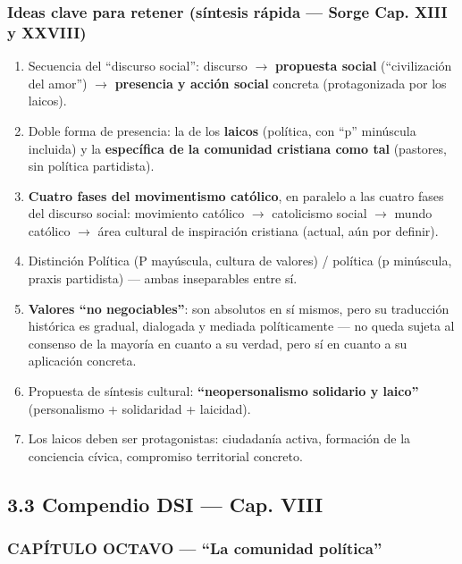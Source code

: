 \documentclass[10pt,a4paper]{article}
\begin{document}
\subsubsection{Ideas clave para retener (síntesis rápida --- Sorge Cap. XIII y XXVIII)}
\begin{enumerate}
\item Secuencia del ``discurso social'': discurso $\rightarrow$ \textbf{propuesta social} (``civilización del amor'') $\rightarrow$ \textbf{presencia y acción social} concreta (protagonizada por los laicos).
\item Doble forma de presencia: la de los \textbf{laicos} (política, con ``p'' minúscula incluida) y la \textbf{específica de la comunidad cristiana como tal} (pastores, sin política partidista).
\item \textbf{Cuatro fases del movimentismo católico}, en paralelo a las cuatro fases del discurso social: movimiento católico $\rightarrow$ catolicismo social $\rightarrow$ mundo católico $\rightarrow$ área cultural de inspiración cristiana (actual, aún por definir).
\item Distinción Política (P mayúscula, cultura de valores) / política (p minúscula, praxis partidista) --- ambas inseparables entre sí.
\item \textbf{Valores ``no negociables''}: son absolutos en sí mismos, pero su traducción histórica es gradual, dialogada y mediada políticamente --- no queda sujeta al consenso de la mayoría en cuanto a su verdad, pero sí en cuanto a su aplicación concreta.
\item Propuesta de síntesis cultural: \textbf{``neopersonalismo solidario y laico''} (personalismo + solidaridad + laicidad).
\item Los laicos deben ser protagonistas: ciudadanía activa, formación de la conciencia cívica, compromiso territorial concreto.
\end{enumerate}



\subsection{3.3 Compendio DSI --- Cap. VIII}

\subsubsection{CAPÍTULO OCTAVO --- ``La comunidad política''}
\end{document}
